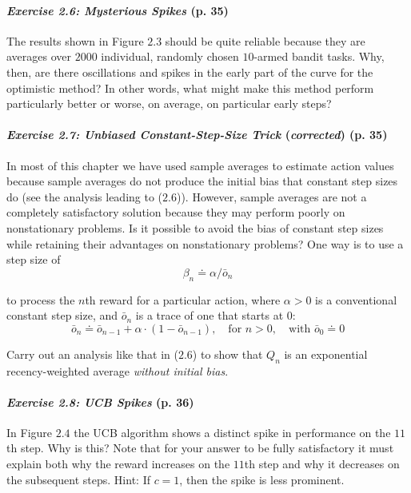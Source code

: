 \documentclass[10pt,a4paper]{article}
\begin{document}
\paragraph{\textit{Exercise 2.6: Mysterious Spikes} (p. 35)} The results shown in Figure $2.3$ should be quite reliable because they are averages over $2000$ individual, randomly chosen $10$-armed bandit tasks.
Why, then, are there oscillations and spikes in the early part of the curve for the optimistic method? In other words, what might make this method perform particularly better or worse, on average, on particular early steps?

\paragraph{\textit{Exercise 2.7: Unbiased Constant-Step-Size Trick} (\textit{corrected}) (p. 35)} In most of this chapter we have used
sample averages to estimate action values because sample averages do not produce the
initial bias that constant step sizes do (see the analysis leading to ($2.6$)). However, sample averages are not a completely satisfactory solution because they may perform poorly on nonstationary problems. Is it possible to avoid the bias of constant step sizes while retaining their advantages on nonstationary problems? One way is to use a step size of
\begin{equation}
\beta_n \doteq \alpha/\bar{o}_n
\end{equation}

to process the $n$th reward for a particular action, where $\alpha > 0$ is a conventional constant step size, and $\bar{o}_n$ is a trace of one that starts at $0$:
\begin{equation}
\bar{o}_n \doteq \bar{o}_{n-1} + \alpha \cdot (1 - \bar{o}_{n-1}),\quad \textrm{for } n > 0,\quad \textrm{with } \bar{o}_0 \doteq 0
\end{equation}

Carry out an analysis like that in ($2.6$) to show that $Q_n$ is an exponential recency-weighted average \textit{without initial bias}.

\paragraph{\textit{Exercise 2.8: UCB Spikes} (p. 36)} In Figure $2.4$ the UCB algorithm shows a distinct spike
in performance on the $11$th step. Why is this? Note that for your answer to be fully satisfactory it must explain both why the reward increases on the $11$th step and why it decreases on the subsequent steps. Hint: If $c = 1$, then the spike is less prominent.
\end{document}
